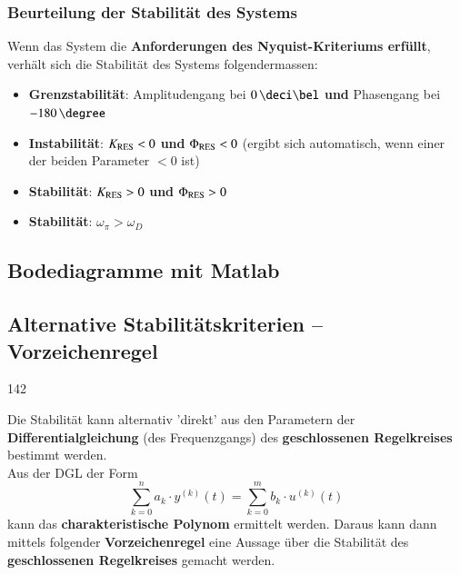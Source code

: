 \subsubsection{Beurteilung der Stabilität des Systems}

Wenn das System die \textbf{Anforderungen des Nyquist-Kriteriums erfüllt}, verhält sich die Stabilität des Systems folgendermassen:

\begin{itemize}
    \item \textbf{Grenzstabilität}: Amplitudengang bei $0 \, \deci \bel$ \textbf{und} Phasengang bei $-180 \, \degree$
    \item \textbf{Instabilität}:  $K_{\rm RES} < 0$ \textbf{und} $\Phi_{\rm RES} < 0$ (ergibt sich automatisch, wenn einer der 
        beiden Parameter $< 0$ ist)
    \item \textbf{Stabilität}: $K_{\rm RES} > 0$ \textbf{und} $\Phi_{\rm RES} > 0$ 
    \item \textbf{Stabilität}: $\omega_{\pi} > \omega_D$  %
\end{itemize}


\subsection{Bodediagramme mit Matlab}




\subsection{Alternative Stabilitätskriterien -- Vorzeichenregel}{142}

Die Stabilität kann alternativ 'direkt' aus den Parametern der \textbf{Differentialgleichung} (des
Frequenzgangs) des \textbf{geschlossenen Regelkreises} bestimmt werden.\\
Aus der DGL der Form
$$ \sum\limits_{k=0}^n a_k \cdot y^{(k)}(t) = \sum\limits_{k=0}^m b_k \cdot u^{(k)}(t) $$
kann das \textbf{charakteristische Polynom} ermittelt werden. Daraus kann dann mittels 
folgender \textbf{Vorzeichenregel} eine Aussage über die Stabilität des \textbf{geschlossenen Regelkreises} 
gemacht werden.

